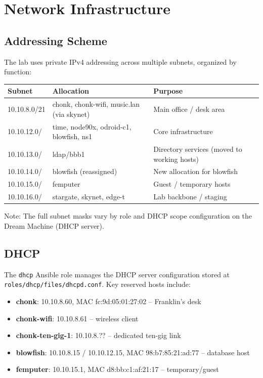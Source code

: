 \section{Network Infrastructure}

\subsection{Addressing Scheme}

The lab uses private IPv4 addressing across multiple subnets, organized by function:

\begin{tabularx}{\textwidth}{l l X}
\textbf{Subnet} & \textbf{Allocation} & \textbf{Purpose} \\
\hline
10.10.8.0/21 & chonk, chonk-wifi, music.lan (via skynet) & Main office / desk area\\
10.10.12.0/& time, node90x, odroid-c1, blowfish, ns1 & Core infrastructure\\
10.10.13.0/ & ldap/bbb1 & Directory services (moved to working hosts)\\
10.10.14.0/ & blowfish (reassigned) & New allocation for blowfish\\
10.10.15.0/ & femputer & Guest / temporary hosts\\
10.10.16.0/& stargate, skynet, edge-t & Lab backbone / staging
\end{tabularx}

Note: The full subnet masks vary by role and DHCP scope configuration on the Dream Machine (DHCP server).

\subsection{DHCP}

The \texttt{dhcp} Ansible role manages the DHCP server configuration stored at \texttt{roles/dhcp/files/dhcpd.conf}. Key reserved hosts include:

\begin{itemize}
    \item \textbf{chonk}: 10.10.8.60, MAC fc:9d:05:01:27:02 -- Franklin's desk
    \item \textbf{chonk-wifi}: 10.10.8.61 -- wireless client
    \item \textbf{chonk-ten-gig-1}: 10.10.8.?? -- dedicated ten-gig link
    \item \textbf{blowfish}: 10.10.8.15 / 10.10.12.15, MAC 98:b7:85:21:ad:77 -- database host
    \item \textbf{femputer}: 10.10.15.1, MAC d8:bb:c1:af:21:17 -- temporary/guest
\end{itemize}

